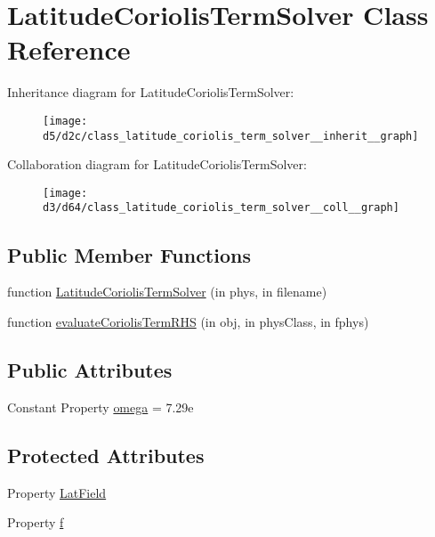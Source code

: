 \hypertarget{class_latitude_coriolis_term_solver}{}\section{Latitude\+Coriolis\+Term\+Solver Class Reference}
\label{class_latitude_coriolis_term_solver}


Inheritance diagram for Latitude\+Coriolis\+Term\+Solver\+:
\nopagebreak
\begin{figure}[H]
\begin{center}
\leavevmode
\texttt{[image: d5/d2c/class\_latitude\_coriolis\_term\_solver\_\_inherit\_\_graph]}
\end{center}
\end{figure}


Collaboration diagram for Latitude\+Coriolis\+Term\+Solver\+:
\nopagebreak
\begin{figure}[H]
\begin{center}
\leavevmode
\texttt{[image: d3/d64/class\_latitude\_coriolis\_term\_solver\_\_coll\_\_graph]}
\end{center}
\end{figure}
\subsection*{Public Member Functions}
\begin{DoxyCompactItemize}
\item 
function \hyperlink{class_latitude_coriolis_term_solver_a50662475bccce96e75d738a2c505a4ad}{Latitude\+Coriolis\+Term\+Solver} (in phys, in filename)
\item 
function \hyperlink{class_latitude_coriolis_term_solver_a452c1153cbb0470d054c9fae34954f14}{evaluate\+Coriolis\+Term\+R\+HS} (in obj, in phys\+Class, in fphys)
\end{DoxyCompactItemize}
\subsection*{Public Attributes}
\begin{DoxyCompactItemize}
\item 
Constant Property \hyperlink{class_latitude_coriolis_term_solver_afa21bead332ccbec01e77e66013cacda}{omega} = 7.\+29e
\end{DoxyCompactItemize}
\subsection*{Protected Attributes}
\begin{DoxyCompactItemize}
\item 
Property \hyperlink{class_latitude_coriolis_term_solver_a7232cefe369fa3a91ee5798f6487dd1c}{Lat\+Field}
\item 
Property \hyperlink{class_latitude_coriolis_term_solver_a57e10f585032ca613eb82cbd8ee1206b}{f}
\end{DoxyCompactItemize}


